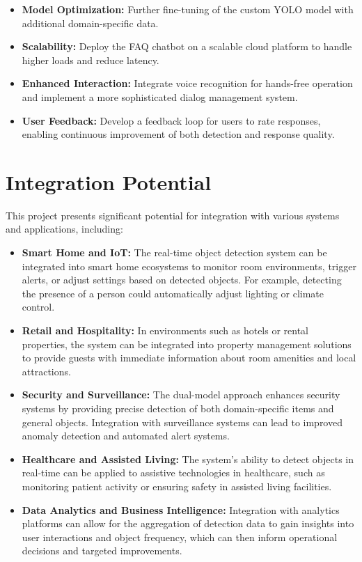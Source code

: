 \documentclass[12pt]{article}
\begin{document}
\begin{itemize}
    \item \textbf{Model Optimization:} Further fine-tuning of the custom YOLO model with additional domain-specific data.
    \item \textbf{Scalability:} Deploy the FAQ chatbot on a scalable cloud platform to handle higher loads and reduce latency.
    \item \textbf{Enhanced Interaction:} Integrate voice recognition for hands-free operation and implement a more sophisticated dialog management system.
    \item \textbf{User Feedback:} Develop a feedback loop for users to rate responses, enabling continuous improvement of both detection and response quality.
\end{itemize}

\section{Integration Potential}

This project presents significant potential for integration with various systems and applications, including:

\begin{itemize}
    \item \textbf{Smart Home and IoT:} The real-time object detection system can be integrated into smart home ecosystems to monitor room environments, trigger alerts, or adjust settings based on detected objects. For example, detecting the presence of a person could automatically adjust lighting or climate control.
    \item \textbf{Retail and Hospitality:} In environments such as hotels or rental properties, the system can be integrated into property management solutions to provide guests with immediate information about room amenities and local attractions.
    \item \textbf{Security and Surveillance:} The dual-model approach enhances security systems by providing precise detection of both domain-specific items and general objects. Integration with surveillance systems can lead to improved anomaly detection and automated alert systems.
    \item \textbf{Healthcare and Assisted Living:} The system’s ability to detect objects in real-time can be applied to assistive technologies in healthcare, such as monitoring patient activity or ensuring safety in assisted living facilities.
    \item \textbf{Data Analytics and Business Intelligence:} Integration with analytics platforms can allow for the aggregation of detection data to gain insights into user interactions and object frequency, which can then inform operational decisions and targeted improvements.
\end{itemize}
\end{document}
